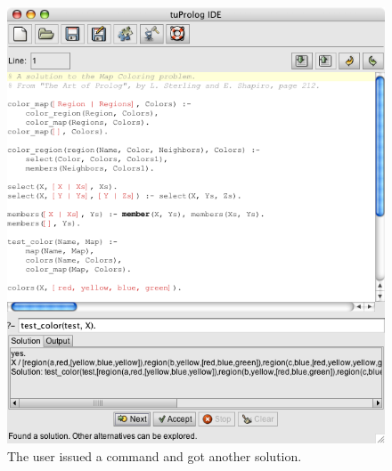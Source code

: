 \begin{figure}
\centering
\includegraphics[scale=0.605]{images/nextSolutionAsked}
\caption{The user issued a  command and got another solution.}
\label{next-solution-asked}
\end{figure}

